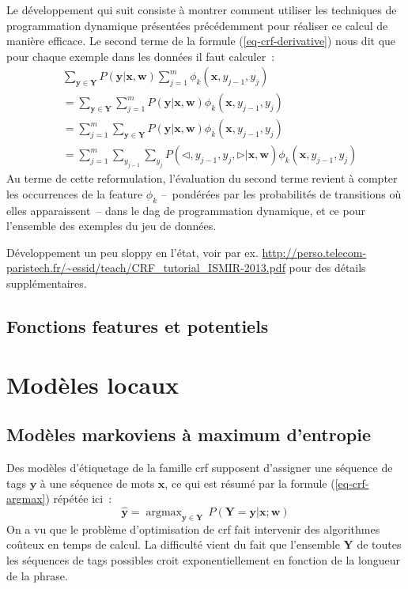 \documentclass[11pt,openany]{book}
\newcommand{\ac}[1]{{\sc #1}} %
\begin{document}
Le développement qui suit consiste à montrer comment utiliser les techniques de programmation dynamique présentées précédemment pour réaliser ce calcul de manière efficace.  Le second terme de la formule (\ref{eq-crf-derivative}) nous dit que pour chaque exemple dans les données il faut calculer~:
\begin{align}
&\sum_{\mathbf{y}\in \mathbf{Y}} P(\mathbf{y}|\mathbf{x},\mathbf{w}) \sum_{j=1}^m \phi_k(\mathbf{x},y_{j-1},y_j)\\
&=\sum_{\mathbf{y}\in \mathbf{Y}} \sum_{j=1}^m P(\mathbf{y}|\mathbf{x},\mathbf{w})  \phi_k(\mathbf{x},y_{j-1},y_j)\\
&= \sum_{j=1}^m \sum_{\mathbf{y}\in \mathbf{Y}} P(\mathbf{y}|\mathbf{x},\mathbf{w})  \phi_k(\mathbf{x},y_{j-1},y_j)\\
&=  \sum_{j=1}^m \sum_{y_{j-1}}\sum_{y_j} P(\lhd,y_{j-1},y_j,\rhd|\mathbf{x},\mathbf{w})  \phi_k(\mathbf{x},y_{j-1},y_j)
\end{align}
Au terme de cette reformulation, l'évaluation du second terme revient à compter les occurrences de la feature $\phi_k$ --~pondérées par les probabilités de transitions où elles apparaissent~-- dans le \ac{dag} de programmation dynamique, et ce pour l'ensemble des exemples du jeu de données.

{\color{red} Développement un peu sloppy en l'état, voir par ex.
\url{http://perso.telecom-paristech.fr/~essid/teach/CRF_tutorial_ISMIR-2013.pdf}
pour des détails supplémentaires.}


\section{Fonctions features et potentiels}



\chapter{Modèles locaux}


\section{Modèles markoviens à maximum d'entropie}

Des modèles d'étiquetage de la famille {\sc crf} supposent d'assigner une séquence de tags
$\mathbf{y}$ à une séquence de mots $\mathbf{x}$, ce qui est résumé par la formule (\ref{eq-crf-argmax})
répétée ici~:
\begin{equation}
\hat{\mathbf{y}} =  \mathop{\text{argmax}}_{\mathbf{y}\in \mathbf{Y}}
\, P(\mathbf{Y}=\mathbf{y} | \mathbf{x} ; \mathbf{w})
\end{equation}
On a vu que le problème d'optimisation de {\sc crf} fait intervenir des algorithmes coûteux en temps de calcul. 
La difficulté vient du fait que l'ensemble $\mathbf{Y}$ de toutes les séquences de tags possibles croit exponentiellement en 
fonction de la longueur de la phrase.
\end{document}
